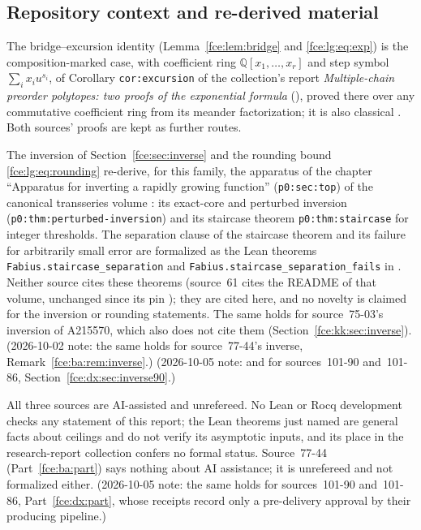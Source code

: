 \documentclass[11pt,a4paper]{article}
\numberwithin{equation}{section}
\theoremstyle{definition}\newtheorem{definition}[theorem]{Definition}
\theoremstyle{remark}\newtheorem{remark}[theorem]{Remark}
\newcommand{\Q}{\mathbb Q}
\begin{document}
\subsection{Repository context and re-derived material}\label{fce:sec:repository}
The bridge--excursion identity (Lemma~\ref{fce:lem:bridge} and
\eqref{fce:lg:eq:exp}) is the composition-marked case, with coefficient
ring $\Q[x_1,\ldots,x_r]$ and step symbol $\sum_ix_iu^{s_i}$, of
Corollary \texttt{cor:excursion} of the collection's report
\emph{Multiple-chain preorder polytopes: two proofs of the exponential
formula} (), proved there over any
commutative coefficient ring from its meander factorization; it is also
classical \cite{bf}. Both sources' proofs are kept as further routes.

The inversion of Section~\ref{fce:sec:inverse} and the rounding bound
\eqref{fce:lg:eq:rounding} re-derive, for this family, the apparatus of the
chapter ``Apparatus for inverting a rapidly growing function''
(\texttt{p0:sec:top}) of the canonical transseries volume
: its
exact-core and perturbed inversion (\texttt{p0:thm:perturbed-inversion})
and its staircase theorem \texttt{p0:thm:staircase} for integer thresholds.
The separation clause of the staircase theorem and its failure for
arbitrarily small error are formalized as the Lean theorems
\texttt{Fabius.staircase\_separation} and
\texttt{Fabius.staircase\_separation\_fails} in
.
Neither source cites these theorems (source~61 cites the README of that
volume, unchanged since its pin \cite{proveit}); they are cited here, and
no novelty is claimed for the inversion or rounding statements. The same
holds for source~75-03's inversion of A215570, which also does not cite
them (Section~\ref{fce:kk:sec:inverse}). (2026-10-02 note: the same holds for
source~77-44's inverse, Remark~\ref{fce:ba:rem:inverse}.) (2026-10-05 note: and for sources~101-90 and~101-86,
Section~\ref{fce:dx:sec:inverse90}.)

All three sources are AI-assisted and unrefereed. No Lean or Rocq development
checks any statement of this report; the Lean theorems just named are
general facts about ceilings and do not verify its asymptotic inputs, and
its place in the research-report collection confers no formal status. Source~77-44
(Part~\ref{fce:ba:part}) says nothing about AI assistance; it is unrefereed
and not formalized either. (2026-10-05 note: the same holds for sources~101-90
and~101-86, Part~\ref{fce:dx:part}, whose receipts record only a pre-delivery
approval by their producing pipeline.)
\end{document}
